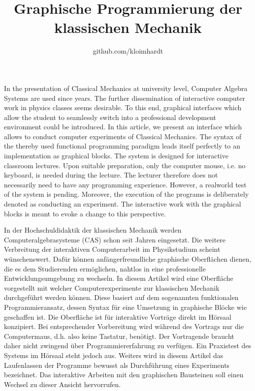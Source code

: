 \documentclass[twocolumn, 10pt]{article}
\begin{document}
\title{Graphische Programmierung der klassischen Mechanik}
\author{github.com/kloimhardt}
\maketitle

\renewcommand{\abstractname}{Abstract}
\abstract
In the presentation of Classical Mechanics at university level, Computer Algebra Systems are used since years. The further dissemination of interactive computer work in physics classes seems desirable. To this end, graphical interfaces which allow the student to seamlessly switch into a professional development environment could be introduced. In this article, we present an interface which allows to conduct computer experiments of Classical Mechanics. The syntax of the thereby used functional programming paradigm leads itself perfectly to an implementation as graphical blocks. The system is designed for interactive classroom lectures. Upon suitable preparation, only the computer mouse, i.e. no keyboard, is needed during the lecture. The lecturer therefore does not necessarily need to have any programming experience. However, a realworld test of the system is pending. Moreover, the execution of the programs is deliberately denoted as conducting an experiment. The interactive work with the graphical blocks is meant to evoke a change to this perspective.

\renewcommand{\abstractname}{Kurzfassung}
\abstract
In der Hochschuldidaktik der klassischen Mechanik werden Computeralgebrasysteme (CAS) schon seit Jahren eingesetzt. Die weitere Verbreitung der interaktiven Computerarbeit im Physikstudium scheint wünschenswert. Dafür können anfängerfreundliche graphische Oberflächen dienen, die es dem Studierenden ermöglichen, nahtlos in eine professionelle Entwicklungsumgebung zu wechseln. In diesem Artikel wird eine Oberfläche vorgestellt mit welcher Computerexperimente zur klassischen Mechanik durchgeführt werden können. Diese basiert auf dem sogenannten funktionalen Programmieransatz, dessen Syntax für eine Umsetzung in graphische Blöcke wie geschaffen ist. Die Oberfläche ist für interaktive Vorträge direkt im Hörsaal konzipiert. Bei entsprechender Vorbereitung wird während des Vortrags nur die Computermaus, d.h. also keine Tastatur, benötigt. Der Vortragende braucht daher nicht zwingend über Programmiererfahrung zu verfügen. Ein Praxistest des Systems im Hörsaal steht jedoch aus. Weiters wird in diesem Artikel das Laufenlassen der Programme bewusst als Durchführung eines Experiments bezeichnet. Das interaktive Arbeiten mit den graphischen Bausteinen soll einen Wechsel zu dieser Ansicht hervorrufen.
\end{document}
